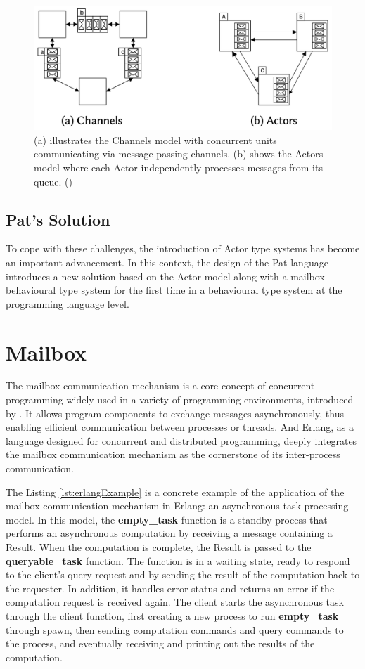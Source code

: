 \documentclass{l4proj}
\begin{document}
\begin{figure}
    \centering
    \includegraphics[width=0.7\linewidth]{images/channel_actor.png}    
    \caption{ (a) illustrates the Channels model with concurrent units communicating via message-passing channels. (b) shows the Actors model where each Actor independently processes messages from its queue. (\cite{fowler_mixing})
    }
    \label{fig:channel_actor} 
\end{figure}

\subsection{Pat's Solution}
To cope with these challenges, the introduction of Actor type systems has become an important advancement. In this context, the design of the Pat language introduces a new solution based on the Actor model along with a mailbox behavioural type system for the first time in a behavioural type system at the programming language level.


\section{Mailbox}
The mailbox communication mechanism is a core concept of concurrent programming widely used in a variety of programming environments, introduced by 
\cite{ford_1976_hardware}. It allows program components to exchange messages asynchronously, thus enabling efficient communication between processes or threads. And Erlang, as a language designed for concurrent and distributed programming, deeply integrates the mailbox communication mechanism as the cornerstone of its inter-process communication.

The Listing \ref{lst:erlangExample} is a concrete example of the application of the mailbox communication mechanism in Erlang: an asynchronous task processing model. In this model, the \textbf{empty\_task} function is a standby process that performs an asynchronous computation by receiving a message containing a Result. When the computation is complete, the Result is passed to the \textbf{queryable\_task} function. The function is in a waiting state, ready to respond to the client's query request and by sending the result of the computation back to the requester. In addition, it handles error status and returns an error if the computation request is received again. The client starts the asynchronous task through the client function, first creating a new process to run \textbf{empty\_task} through spawn, then sending computation commands and query commands to the process, and eventually receiving and printing out the results of the computation.
\end{document}
